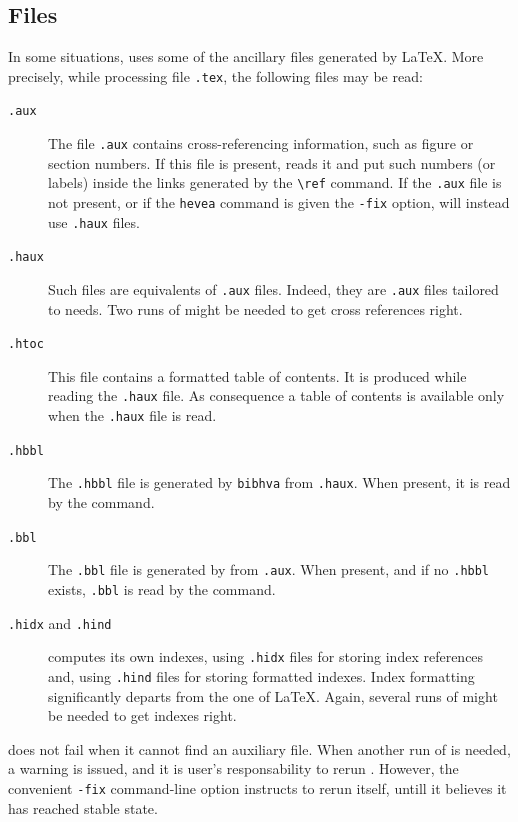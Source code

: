 \subsection{Files}\label{files}
In some situations,
\hevea{} uses some of the ancillary files generated by \LaTeX.
More precisely, while processing file \texttt{.tex},
the following files may be read:
\begin{description}
\item[\protect\texttt{.aux}] The file \texttt{.aux} contains
cross-referencing information, such as figure or section numbers.
If this file is present, \hevea{} reads it and put such numbers (or
labels) inside
the links generated by the \verb+\ref+ command. If the \texttt{.aux}
file is not present, or if the \texttt{hevea} command is given the
\texttt{-fix} option, \hevea{} will instead use \texttt{.haux}
files.
\item[\protect\texttt{.haux}] Such files are \hevea{} equivalents of
\texttt{.aux} files. Indeed, they are \texttt{.aux} files tailored to
\hevea{} needs.
Two runs of \hevea{} might be needed to get cross references right.
\item[\protect\texttt{.htoc}] This file contains a formatted table of
contents. It is produced while reading the \texttt{.haux} file.
As consequence a table of contents is available only when the
\texttt{.haux} file is read.


\item[\protect\texttt{.hbbl}] The \texttt{.hbbl} file
is generated by \texttt{bibhva} from \texttt{.haux}.
When present, it is read by the \verb++ command.

\item[\protect\texttt{.bbl}] The \texttt{.bbl} file is
generated by \BibTeX{} from \texttt{.aux}.
When present, and if no \texttt{.hbbl} exists,
\texttt{.bbl} is read by the \verb++ command.

\item[\protect\texttt{.hidx} and \protect\texttt{.hind}]
\hevea{} computes its own indexes, using \texttt{.hidx} files for
storing index references and, using \texttt{.hind} files
for storing formatted indexes.
Index formatting significantly departs from the one of \LaTeX{}.
Again, several runs of \hevea{} might be needed to get indexes right.
\end{description}

\noindent\hevea{} does not fail when it cannot find an auxiliary file.
When another run of \hevea{} is needed, a warning is issued,
and it is user's responsability to rerun \hevea{}.
However, the convenient \texttt{-fix} command-line option instructs
\hevea{} to rerun itself, untill it believes it has reached stable state.

